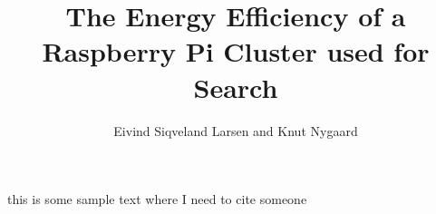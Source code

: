 \documentclass[a4paper, 12pt]{article}
\title{The Energy Efficiency of a Raspberry Pi Cluster used for Search}
\author{Eivind Siqveland Larsen and Knut Nygaard}
\begin{document}
\maketitle



\tableofcontents


this is some sample text where I need to cite someone \cite{BEOwulf}










	
\end{document}
